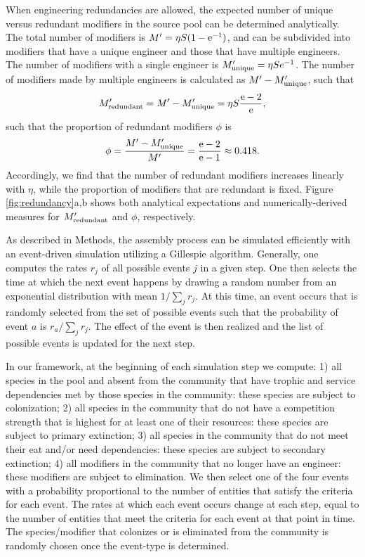 \documentclass[onecolumn,preprintnumbers,amsmath,amssymb,superscriptaddress]{revtex4-1}
\newcommand{\rr}[1]{{\rm #1}}
\begin{document}
\begin{bibunit}
When engineering redundancies are allowed, the expected number of unique versus redundant modifiers in the source pool can be determined analytically.
The total number of modifiers is $M^\prime = \eta S (1 - \rr{e}^{-1})$, and can be subdivided into modifiers that have a unique engineer and those that have multiple engineers.
The number of modifiers with a single engineer is $M^\prime_{\rr{unique}} = \eta S e^{-1}$.
The number of modifiers made by multiple engineers is calculated as $M^\prime - M^\prime_{\rr{unique}}$, such that
\begin{equation}
M^\prime_{\rr{redundant}} =M^\prime - M^\prime_{\rr{unique}}= \eta S \frac{\rr{e} - 2}{\rr{e}},
\label{eq:redundant}
\end{equation}
such that the proportion of redundant modifiers $\phi$ is
\begin{equation}
\phi = \frac{M^\prime - M^\prime_{\rr{unique}}}{M^\prime} = \frac{\rr{e}-2}{\rr{e}-1} \approx 0.418.
\label{eq:redundantprop}
\end{equation}
Accordingly, we find that the number of redundant modifiers increases linearly with $\eta$, while the proportion of modifiers that are redundant is fixed.
Figure \ref{fig:redundancy}a,b shows both analytical expectations and numerically-derived measures for $M^\prime_{\rr{redundant}}$ and $\phi$, respectively.

As described in Methods, the assembly process can be simulated efficiently with an event-driven simulation utilizing a Gillespie algorithm.
Generally, one computes the rates $r_j$ of all possible events $j$ in a given step.
One then selects the time at which the next event happens by drawing a random number from an exponential distribution with mean $1/\sum_j{r_j}$.
At this time, an event occurs that is randomly selected from the set of possible events such that the probability of event $a$ is $r_a/\sum_j{r_j}$.
The effect of the event is then realized and the list of possible events is updated for the next step.

In our framework, at the beginning of each simulation step we compute:
1) all species in the pool and absent from the community that have trophic and service dependencies met by those species in the community: these species are subject to colonization;
2) all species in the community that do not have a competition strength that is highest for at least one of their resources: these species are subject to primary extinction;
3) all species in the community that do not meet their eat and/or need dependencies: these species are subject to secondary extinction;
4) all modifiers in the community that no longer have an engineer: these modifiers are subject to elimination.
We then select one of the four events with a probability proportional to the number of entities that satisfy the criteria for each event.
The rates at which each event occurs change at each step, equal to the number of entities that meet the criteria for each event at that point in time.
The species/modifier that colonizes or is eliminated from the community is randomly chosen once the event-type is determined.


\end{bibunit}
\end{document}
